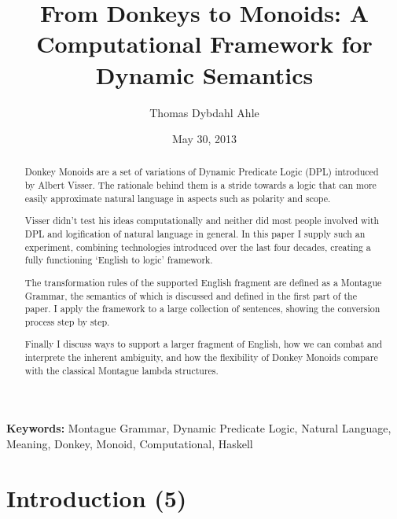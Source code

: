 \documentclass[12pt]{article}
\title{From Donkeys to Monoids: A Computational Framework for Dynamic Semantics}
\author{Thomas Dybdahl Ahle}
\date{May 30, 2013}
\let\stdsection\section
\renewcommand\section{\newpage\stdsection}
\begin{document}
\maketitle

\begin{abstract}


Donkey Monoids are a set of variations of Dynamic Predicate Logic (DPL) introduced by Albert Visser. The rationale behind them is a stride towards a logic that can more easily approximate natural language in aspects such as polarity and scope.

Visser didn't test his ideas computationally and neither did most people involved with DPL and logification of natural language in general. In this paper I supply such an experiment, combining technologies introduced over the last four decades, creating a fully functioning `English to logic' framework.

The transformation rules of the supported English fragment are defined as a Montague Grammar, the semantics of which is discussed and defined in the first part of the paper. I apply the framework to a large collection of sentences, showing the conversion process step by step.

Finally I discuss ways to support a larger fragment of English, how we can combat and interprete the inherent ambiguity, and how the flexibility of Donkey Monoids compare with the classical Montague lambda structures.

\end{abstract}

\smallskip\smallskip
\noindent \small{\textbf{Keywords:} Montague Grammar, Dynamic Predicate Logic, Natural Language, Meaning, Donkey, Monoid, Computational, Haskell}

\tableofcontents


\section{Introduction (5)}
\end{document}
